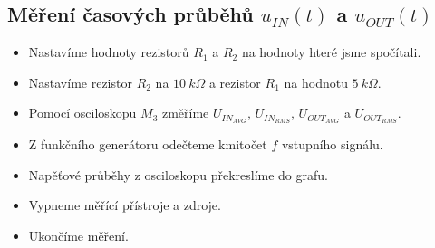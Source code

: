 	\subsection{Měření časových průběhů $u_{IN}(t)$ a $u_{OUT}(t)$}
    \begin{itemize}
      \item
        Nastavíme hodnoty rezistorů $R_1$ a $R_2$ na hodnoty hteré jsme spočítali.
      \item
      	Nastavíme rezistor $R_2$ na $10~k\Omega$ a rezistor $R_1$ na hodnotu $5~k\Omega$.
      \item
        Pomocí osciloskopu $M_3$ změříme $U_{IN_{AVG}}$, $U_{IN_{RMS}}$, $U_{OUT_{AVG}}$ a $U_{OUT_{RMS}}$.
      \item
      	Z funkčního generátoru odečteme kmitočet $f$ vstupního signálu.
      \item
        Napěťové průběhy z osciloskopu překreslíme do grafu.
      \item
      	Vypneme měřící přístroje a zdroje.
      \item
        Ukončíme měření.
		\end{itemize}
